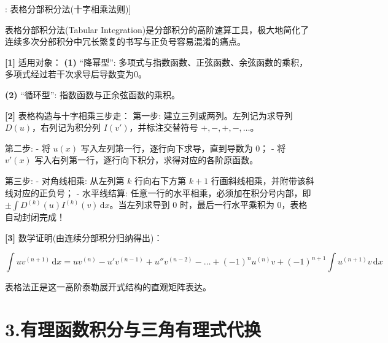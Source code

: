 \documentclass[11pt,a4paper,UTF8]{ctexart}
\begin{document}
\begin{thmbox}[方法[3]: 表格分部积分法(十字相乘法则)]

表格分部积分法(Tabular Integration)是分部积分的高阶速算工具，极大地简化了连续多次分部积分中冗长繁复的书写与正负号容易混淆的痛点。

\textbf{[1]} 适用对象：
\textbf{(1)}  “降幂型”: 多项式与指数函数、正弦函数、余弦函数的乘积，多项式经过若干次求导后导数变为0。

\textbf{(2)}  “循环型”: 指数函数与正余弦函数的乘积。

\textbf{[2]} 表格构造与十字相乘三步走：
第一步: 建立三列或两列。左列记为求导列 $D(u)$，右列记为积分列 $I(v')$，并标注交替符号 $+ , - , + , - , \dots$。

第二步:
- 将 $u(x)$ 写入左列第一行，逐行向下求导，直到导数为 0；
- 将 $v'(x)$ 写入右列第一行，逐行向下积分，求得对应的各阶原函数。

第三步:
- 对角线相乘: 从左列第 $k$ 行向右下方第 $k+1$ 行画斜线相乘，并附带该斜线对应的正负号；
- 水平线结算: 任意一行的水平相乘，必须加在积分号内部，即 $\pm \int D^{(k)}(u) I^{(k)}(v)\,\mathrm{d}x$。当左列求导到 0 时，最后一行水平乘积为 0，表格自动封闭完成！

\textbf{[3]} 数学证明(由连续分部积分归纳得出)：

\begin{equation*}
\int u v^{(n+1)}\,\mathrm{d}x = u v^{(n)} - u' v^{(n-1)} + u'' v^{(n-2)} - \dots + (-1)^n u^{(n)} v + (-1)^{n+1}\int u^{(n+1)} v\,\mathrm{d}x
\end{equation*}


表格法正是这一高阶泰勒展开式结构的直观矩阵表达。

\end{thmbox}

\section{3.有理函数积分与三角有理式代换}
\end{document}
